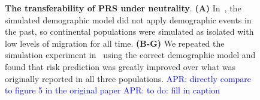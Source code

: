 \documentclass{article}
\newcommand{\aprcomment}[1]{{\textcolor{blue}{APR: #1}}}
\begin{document}
\begin{figure}[ht]
\begin{center}
\caption{\textbf{The transferability of PRS under neutrality}.
    \textbf{(A)} In~\citet{martin2017human}, the simulated demographic model did not apply demographic
    events in the past, so continental populations were simulated as isolated with low levels of migration
    for all time.
    \textbf{(B-G)} We repeated the simulation experiment in~\cite{martin2017human} using the correct 
    demographic model and found that risk prediction was greatly improved over what was originally 
    reported in all three populations.
    \aprcomment{directly compare to figure 5 in the original paper}
    \aprcomment{to do: fill in caption}
}
\label{fig:prs}
\end{center}
\end{figure}
\end{document}
